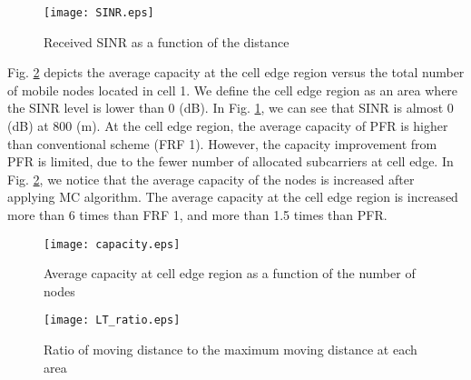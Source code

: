 \documentclass[conference]{IEEEtran}
\begin{document}
\begin{figure}[tbp]
\centering
\texttt{[image: SINR.eps]}
\caption{Received SINR as a function of the distance}
\label{F:SINR}
\end{figure}


Fig. \ref{F:capacity} depicts the average capacity at the cell edge region versus the total number of mobile nodes located in cell 1. We define the cell edge region as an area where the SINR level is lower than 0 (dB). In Fig. \ref{F:SINR}, we can see that SINR is almost 0 (dB) at 800 (m). At the cell edge region, the average capacity of PFR is higher than conventional scheme (FRF 1). However, the capacity improvement from PFR is limited, due to the fewer number of allocated subcarriers at cell edge. In Fig. \ref{F:capacity}, we notice that the average capacity of the nodes is increased after applying MC algorithm. The average capacity at the cell edge region is increased more than 6 times than FRF 1, and more than 1.5 times than PFR.


\begin{figure}[tbp]
\centering
\texttt{[image: capacity.eps]}
\caption{Average capacity at cell edge region as a function of the number of nodes}
\label{F:capacity}
\end{figure}


\begin{figure}[tbp]
\centering
\texttt{[image: LT\_ratio.eps]}
\caption{Ratio of moving distance to the maximum moving distance at each area}
\label{F:LT_ratio}
\end{figure}
\end{document}
